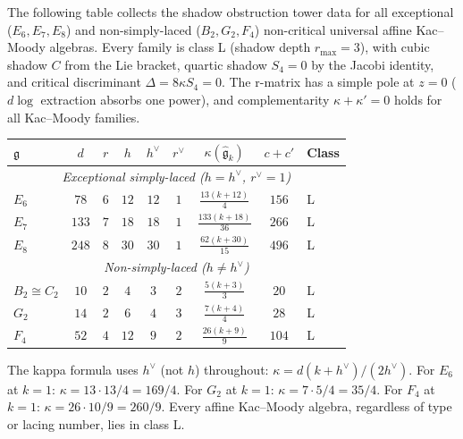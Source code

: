 \begin{remark}
\label{rem:exceptional-nsl-shadow-summary}

The following table collects the shadow obstruction tower data for all exceptional ($E_6, E_7, E_8$) and non-simply-laced ($B_2, G_2, F_4$) non-critical universal affine Kac--Moody algebras. Every family is class L (shadow depth $r_{\max} = 3$), with cubic shadow $C$ from the Lie bracket, quartic shadow $S_4 = 0$ by the Jacobi identity, and critical discriminant $\Delta = 8\kappa S_4 = 0$. The r-matrix has a simple pole at $z = 0$ ($d\log$ extraction absorbs one power), and complementarity $\kappa + \kappa' = 0$ holds for all Kac--Moody families.
\begin{center}
\renewcommand{\arraystretch}{1.3}
\begin{tabular}{lcccccccl}
\toprule
$\mathfrak{g}$ & $d$ & $r$ & $h$ & $h^\vee$ & $r^\vee$ & $\kappa(\widehat{\mathfrak{g}}_k)$ & $c + c'$ & Class \\
\midrule
\multicolumn{9}{c}{\textit{Exceptional simply-laced ($h = h^\vee$, $r^\vee = 1$)}} \\
$E_6$ & $78$ & $6$ & $12$ & $12$ & $1$ & $\frac{13(k+12)}{4}$ & $156$ & L \\[2pt]
$E_7$ & $133$ & $7$ & $18$ & $18$ & $1$ & $\frac{133(k+18)}{36}$ & $266$ & L \\[2pt]
$E_8$ & $248$ & $8$ & $30$ & $30$ & $1$ & $\frac{62(k+30)}{15}$ & $496$ & L \\
\midrule
\multicolumn{9}{c}{\textit{Non-simply-laced ($h \neq h^\vee$)}} \\
$B_2 \cong C_2$ & $10$ & $2$ & $4$ & $3$ & $2$ & $\frac{5(k+3)}{3}$ & $20$ & L \\[2pt]
$G_2$ & $14$ & $2$ & $6$ & $4$ & $3$ & $\frac{7(k+4)}{4}$ & $28$ & L \\[2pt]
$F_4$ & $52$ & $4$ & $12$ & $9$ & $2$ & $\frac{26(k+9)}{9}$ & $104$ & L \\
\bottomrule
\end{tabular}
\end{center}
The kappa formula uses $h^\vee$ (not $h$) throughout: $\kappa = d(k+h^\vee)/(2h^\vee)$. For $E_6$ at $k=1$: $\kappa = 13 \cdot 13/4 = 169/4$. For $G_2$ at $k=1$: $\kappa = 7 \cdot 5/4 = 35/4$. For $F_4$ at $k=1$: $\kappa = 26 \cdot 10/9 = 260/9$. Every affine Kac--Moody algebra, regardless of type or lacing number, lies in class L.
\end{remark}


